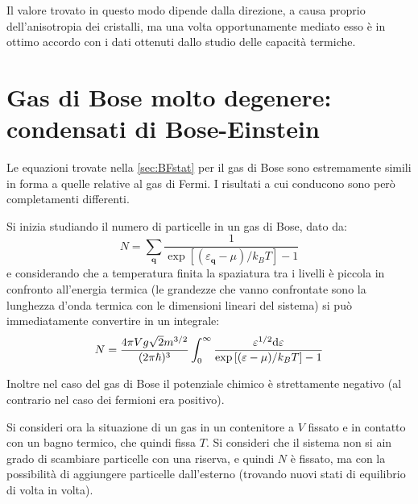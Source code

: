 Il valore trovato in questo modo dipende dalla direzione, a causa proprio dell'anisotropia dei cristalli, ma una volta opportunamente mediato esso è in ottimo accordo con i dati ottenuti dallo studio delle capacità termiche.

\section{Gas di Bose molto degenere: condensati di Bose-Einstein}
\label{sec:bosegas}

Le equazioni trovate nella \cref{sec:BFstat} per il gas di Bose sono estremamente simili in forma a quelle relative al gas di Fermi. I risultati a cui conducono sono però completamenti differenti.
\newline

Si inizia studiando il numero di particelle in un gas di Bose, dato da:
\begin{equation*}
N = \sum_{\textbf{q}}  \frac{1}{ \exp\left[(\varepsilon_{\textbf{q}} - \mu)/k_B T\right] - 1}
\end{equation*}
e considerando che a temperatura finita la spaziatura tra i livelli è piccola in confronto all'energia termica (le grandezze che vanno confrontate sono la lunghezza d'onda termica con le dimensioni lineari del sistema) si può immediatamente convertire in un integrale:
\begin{equation*}
N =  \frac{4\pi V g \sqrt{2} m^{3/2}}{(2\pi \hbar)^3} \int_{0}^{\infty}  \frac{\varepsilon^{1/2} \dd \varepsilon}{ \exp\left[(\varepsilon - \mu)/k_B T\right] - 1}
\end{equation*}

Inoltre nel caso del gas di Bose il potenziale chimico è strettamente negativo (al contrario nel caso dei fermioni era positivo).

Si consideri ora la situazione di un gas in un contenitore a  $V$ fissato e in contatto con un bagno termico, che quindi fissa $ T $. Si consideri che il sistema non si ain grado di scambiare particelle con una riserva, e quindi $N$ è fissato, ma con la possibilità di aggiungere particelle dall'esterno (trovando nuovi stati di equilibrio di volta in volta).

